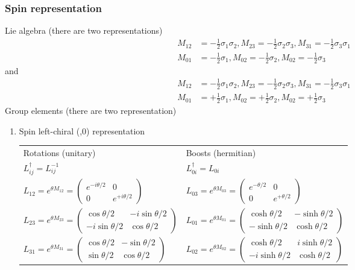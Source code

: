 \documentclass[../main.tex]{subfiles}
\begin{document}
\begin{itemize}
\subsubsection{Spin  representation}
Lie algebra (there are two representations)
\begin{align}
M_{12}&=-\frac{1}{2}\sigma_1\sigma_2,
M_{23}=-\frac{1}{2}\sigma_2\sigma_3,
M_{31}=-\frac{1}{2}\sigma_3\sigma_1\\
M_{01}&=-\frac{1}{2}\sigma_1,
M_{02}=-\frac{1}{2}\sigma_2,
M_{02}=-\frac{1}{2}\sigma_3
\end{align}
and
\begin{align}
M_{12}&=-\frac{1}{2}\sigma_1\sigma_2,
M_{23}=-\frac{1}{2}\sigma_2\sigma_3,
M_{31}=-\frac{1}{2}\sigma_3\sigma_1\\
M_{01}&=+\frac{1}{2}\sigma_1,
M_{02}=+\frac{1}{2}\sigma_2,
M_{02}=+\frac{1}{2}\sigma_3
\end{align}
Group elements (there are two representation)
\begin{enumerate}
\item Spin  left-chiral (,0) representation
\begin{center}
\begin{tabular}{ll}
Rotations (unitary) & Boosts (hermitian)\\
$L_{ij}^\dagger=L_{ij}^{-1}$ & $L_{0i}^\dagger=L_{0i}$\\
$L_{12}=e^{\theta M_{12}}=\left(\begin{matrix}
e^{-i\theta/2} & 0\\
0 & e^{+i\theta/2}
\end{matrix}\right)$ & $L_{03}=e^{\theta M_{03}}=\left(\begin{matrix}
e^{-\theta/2} & 0\\
0 & e^{+\theta/2}
\end{matrix}\right)$\\
$L_{23}=e^{\theta M_{23}}=\left(\begin{matrix}
\cos\theta/2 & -i\sin\theta/2\\
-i\sin\theta/2 & \cos\theta/2
\end{matrix}\right)$ & $L_{01}=e^{\theta M_{01}}=\left(\begin{matrix}
\cosh\theta/2 & -\sinh\theta/2\\
-\sinh\theta/2 & \cosh\theta/2
\end{matrix}\right)$ \\
$L_{31}=e^{\theta M_{31}}=\left(\begin{matrix}
\cos\theta/2 & -\sin\theta/2\\
\sin\theta/2 & \cos\theta/2
\end{matrix}\right)$ & $L_{02}=e^{\theta M_{02}}=\left(\begin{matrix}
\cosh\theta/2 & i\sinh\theta/2\\
-i\sinh\theta/2 & \cosh\theta/2
\end{matrix}\right)$\\
\end{tabular}
\end{center}


\end{enumerate}
\end{itemize}
\end{document}
